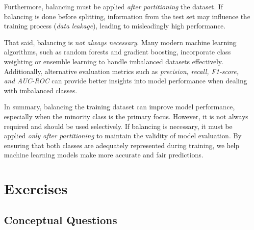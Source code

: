 \documentclass[
  11pt,
]{book}
\theoremstyle{definition}
\theoremstyle{definition}
\theoremstyle{definition}
\theoremstyle{definition}
\theoremstyle{remark}
\begin{document}
Furthermore, balancing must be applied \emph{after partitioning} the dataset. If balancing is done before splitting, information from the test set may influence the training process (\emph{data leakage}), leading to misleadingly high performance.

That said, balancing is \emph{not always necessary}. Many modern machine learning algorithms, such as random forests and gradient boosting, incorporate class weighting or ensemble learning to handle imbalanced datasets effectively. Additionally, alternative evaluation metrics such as \emph{precision, recall, F1-score, and AUC-ROC} can provide better insights into model performance when dealing with imbalanced classes.

In summary, balancing the training dataset can improve model performance, especially when the minority class is the primary focus. However, it is not always required and should be used selectively. If balancing is necessary, it must be applied \emph{only after partitioning} to maintain the validity of model evaluation. By ensuring that both classes are adequately represented during training, we help machine learning models make more accurate and fair predictions.

\section{Exercises}\label{exercises-4}

\subsection*{Conceptual Questions}\label{conceptual-questions-2}
\end{document}
